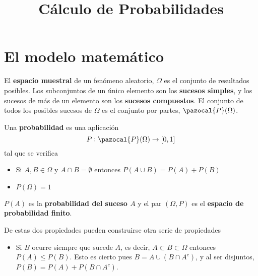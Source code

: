 \documentclass[a4paper, 11pt]{extarticle}
\date{}
\title{\Huge\vspace{-1em}Cálculo de Probabilidades}
\let\mathcal\pazocal
\begin{document}
\maketitle
\vspace{-8em}


\section*{El modelo matemático}
\label{sec:orgcbdc711}
\vspace{-1.5em}
\begin{multicols*}{2}
\vspace{-1.5em}
El \textbf{espacio muestral} de un fenómeno aleatorio, \(\Omega\) es el conjunto
de resultados posibles. Los subconjuntos de un único elemento son los 
\textbf{sucesos simples}, y los sucesos de más de un elemento son los \textbf{sucesos compuestos}.
El conjunto de todos los posibles sucesos de \(\Omega\) es el conjunto
por partes, \(\mathcal{P}(\Omega)\).

Una \textbf{probabilidad} es una aplicación 
\[ P: \mathcal{P}(\Omega) \rightarrow [0,1] \]
tal que se verifica

\begin{itemize}
\item Si \(A,B \in \Omega\) y \(A \cap B = \emptyset\) entonces \(P(A \cup B) = P(A) + P(B)\)

\item \(P(\Omega) = 1\)
\end{itemize}

\(P(A)\) es la \textbf{probabilidad del suceso \(A\)} y el par \((\Omega, P)\) es
el \textbf{espacio de probabilidad finito}. 

De estas dos propiedades pueden construirse otra serie de propiedades
\begin{itemize}
\item Si \(B\) ocurre siempre que sucede \(A\), es decir, \(A \subset B \subset \Omega\) entonces \(P(A) \le P(B)\). Esto es cierto pues \(B = A \cup (B \cap
  A^c)\), y al ser disjuntos, \(P(B) = P(A) + P(B \cap A^c)\).


\end{itemize}
\end{multicols*}
\end{document}
